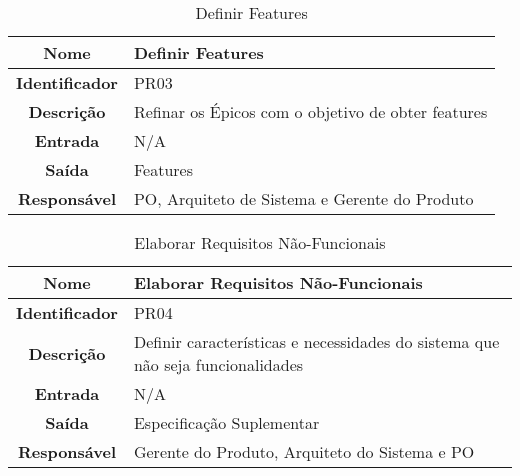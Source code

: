 {              \begin{table}[H]
                \centering
                \caption{Definir Features}
                \begin{tabular}{c|p{10cm}}
                    \hline
                    \textbf{Nome}            & Definir Features\\
                    \hline
                    \textbf{Identificador} & PR03\\ 
                    \hline
                    \textbf{Descrição}   & Refinar os Épicos com o objetivo de obter features\\ 
                    \hline
                    \textbf{Entrada}           & N/A\\
                    \hline
                    \textbf{Saída}            &  Features\\
                    \hline
                    \textbf{Responsável}            & PO, Arquiteto de Sistema e Gerente do Produto\\
                    \hline                    
                \end{tabular}
            \end{table}

              \begin{table}[H]
                \centering
                \caption{Elaborar Requisitos Não-Funcionais}
                \begin{tabular}{c|p{10cm}}
                    \hline
                    \textbf{Nome}            & Elaborar Requisitos Não-Funcionais\\
                    \hline
                    \textbf{Identificador} & PR04\\ 
                    \hline
                    \textbf{Descrição}   & Definir características e necessidades do sistema que não seja funcionalidades\\ 
                    \hline
                    \textbf{Entrada}           & N/A\\
                    \hline
                    \textbf{Saída}            &  Especificação Suplementar\\
                    \hline
                    \textbf{Responsável}            & Gerente do Produto, Arquiteto do Sistema e PO\\
                    \hline                    
                \end{tabular}
            \end{table}

}
